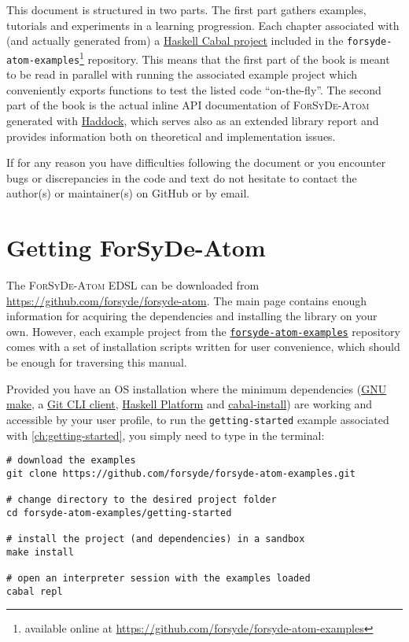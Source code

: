 \documentclass{book}
\begin{document}
\begin{refsection}
This document is structured in two parts. The first part gathers examples, tutorials and experiments in a learning progression. Each chapter associated with (and actually generated from) a \href{https://www.haskell.org/cabal/}{Haskell Cabal project} included in the \texttt{forsyde-atom-examples}\footnote{available online at \url{https://github.com/forsyde/forsyde-atom-examples}} repository. This means that the first part of the book is meant to be read in parallel with running the associated example project which conveniently exports functions to test the listed code ``on-the-fly''. The second part of the book is the actual inline API documentation of \textsc{ForSyDe-Atom} generated with \href{https://www.haskell.org/haddock/}{Haddock}, which serves also as an extended library report and provides information both on theoretical and implementation issues.

\begin{summary}
  If for any reason you have difficulties following the document or you encounter bugs or discrepancies in the code and text do not hesitate to contact the author(s) or maintainer(s) on GitHub or by email. 
\end{summary}

\section{Getting {{\sc ForSyDe-Atom}}}
\label{sec:getting-forsyde-atom}

The \textsc{ForSyDe-Atom} EDSL can be downloaded from \url{https://github.com/forsyde/forsyde-atom}. The main page contains enough information for acquiring the dependencies and installing the library on your own. However, each example project from the \href{https://github.com/forsyde/forsyde-atom-examples}{\texttt{forsyde-atom-examples}} repository comes with a set of installation scripts written for user convenience, which should be enough for traversing this manual.

Provided you have an OS installation where the minimum dependencies (\href{https://www.gnu.org/software/make/}{GNU make}, a \href{https://git-scm.com/downloads}{Git CLI client}, \href{https://www.haskell.org/platform/}{Haskell Platform} and \href{https://www.haskell.org/cabal/download.html}{cabal-install}) are working and accessible by your user profile, to run the \texttt{getting-started} example associated with \cref{ch:getting-started}, you simply need to type in the terminal:

\begin{verbatim}
# download the examples
git clone https://github.com/forsyde/forsyde-atom-examples.git

# change directory to the desired project folder
cd forsyde-atom-examples/getting-started

# install the project (and dependencies) in a sandbox
make install

# open an interpreter session with the examples loaded
cabal repl
\end{verbatim}



\printbibliography[heading=subbibliography]
\end{refsection}
\end{document}
